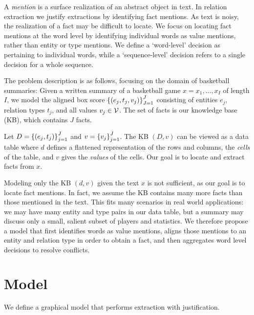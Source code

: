 \documentclass[12pt]{article}
\begin{document}
A \textit{mention} is a surface realization of an abstract object in text.
In relation extraction we justify extractions by identifying fact mentions.
As text is noisy, the realization of a fact may be difficult to locate.
We focus on locating fact mentions at the word level by identifying
individual words as value mentions, rather than entity or type mentions.
We define a `word-level' decision as pertaining to individual words,
while a `sequence-level' decision refers to a single decision for a whole sequence.

\begin{comment}
Note on related work:
Except for \citet{zeng2018copy}, prior work has either assumed that the locations of
entities and values are given as input features or that the locations of entities and values
are observed at training time.
\end{comment}

The problem description is as follows, focusing on the domain of basketball summaries:
Given a written summary of a basketball game $x = x_1, \ldots, x_{I}$
of length $I$,
we model the aligned box score $\left\{(e_j, t_j, v_j)\right\}_{J=1}^J$
consisting of entities $e_j$,
relation types $t_j$, and all values $v_j \in \mathcal{V}$.
The set of facts is our knowledge base (KB), which contains $J$ facts.

Let $D = \left\{(e_j, t_j)\right\}_{j=1}^J$ and $v = \left\{v_j\right\}_{j=1}^J$.
The KB $(D,v)$ can be viewed as a data table where
$d$ defines a flattened representation of the rows and columns,
the \textit{cells} of the table, and
$v$ gives the \textit{values} of the cells.
Our goal is to locate and extract facts from $x$.


Modeling only the KB $(d,v)$ given the text $x$
is not sufficient, as our goal is to locate fact mentions.
In fact, we assume the KB contains many more facts than those mentioned in the text.
This fits many scenarios in real world applications:
we may have many entity and type pairs in our data table,
but a summary may discuss only a small, salient subset of players and statistics.
We therefore propose a model that first identifies words as value mentions,
aligns those mentions to an entity and relation type in order to obtain a fact, 
and then aggregates word level decisions to resolve conflicts.

\section{Model}
We define a graphical model that performs extraction with justification.
\end{document}
